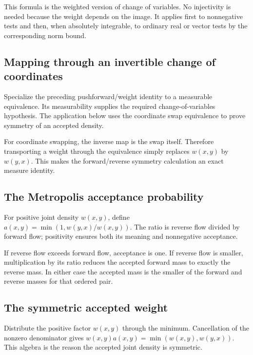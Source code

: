 \documentclass[11pt,a4paper]{article}
\begin{document}
This formula is the weighted version of change of variables. No injectivity is needed because the weight depends on the image. It applies first to nonnegative tests and then, when absolutely integrable, to ordinary real or vector tests by the corresponding norm bound.


\subsection{\texorpdfstring{Mapping through an invertible change of coordinates}{Mapping through an invertible change of coordinates}}


Specialize the preceding pushforward/\allowbreak{}weight identity to a measurable equivalence. Its measurability supplies the required change-of-variables hypothesis. The application below uses the coordinate swap equivalence to prove symmetry of an accepted density.



For coordinate swapping, the inverse map is the swap itself. Therefore transporting a weight through the equivalence simply replaces \(w(x,y)\) by \(w(y,x)\). This makes the forward/\allowbreak{}reverse symmetry calculation an exact measure identity.


\subsection{\texorpdfstring{The Metropolis acceptance probability}{The Metropolis acceptance probability}}


For positive joint density \(w(x,y)\), define \(a(x,y)=\min(1,w(y,x)/w(x,y))\). The ratio is reverse flow divided by forward flow; positivity ensures both its meaning and nonnegative acceptance.



If reverse flow exceeds forward flow, acceptance is one. If reverse flow is smaller, multiplication by its ratio reduces the accepted forward mass to exactly the reverse mass. In either case the accepted mass is the smaller of the forward and reverse masses for that ordered pair.


\subsection{\texorpdfstring{The symmetric accepted weight}{The symmetric accepted weight}}


Distribute the positive factor \(w(x,y)\) through the minimum. Cancellation of the nonzero denominator gives \(w(x,y)a(x,y)=\min(w(x,y),w(y,x))\). This algebra is the reason the accepted joint density is symmetric.
\end{document}
